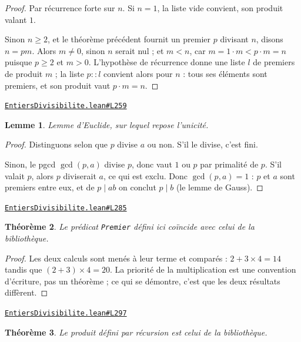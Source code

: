 \documentclass[11pt,a4paper]{article}
\theoremstyle{definition}
\theoremstyle{plain}
\newtheorem{theoreme}{Théorème}
\newtheorem{lemme}[theoreme]{Lemme}
\newcommand{\source}[2]{\par\smallskip\noindent\hfill{\footnotesize\href{#1}{\texttt{#2}}}\par\smallskip}
\begin{document}
\begin{proof}
Par récurrence forte sur $n$. Si $n = 1$, la liste vide convient, son produit valant $1$.

Sinon $n \ge 2$, et le théorème précédent fournit un premier $p$ divisant $n$, disons
$n = pm$. Alors $m \ne 0$, sinon $n$ serait nul ; et $m < n$, car
$m = 1 \cdot m < p \cdot m = n$ puisque $p \ge 2$ et $m > 0$. L'hypothèse de récurrence
donne une liste $l$ de premiers de produit $m$ ; la liste $p :: l$ convient alors pour
$n$ : tous ses éléments sont premiers, et son produit vaut $p \cdot m = n$.
\end{proof}
\source{https://github.com/Commutator-IO/learn-lean/blob/main/cours/01-college/01-nombres-et-calculs/EntiersDivisibilite.lean\#L259}{EntiersDivisibilite.lean\#L259}

\begin{lemme}
Lemme d'Euclide, sur lequel repose l'unicité.
\end{lemme}

\begin{proof}
Distinguons selon que $p$ divise $a$ ou non. S'il le divise, c'est fini.

Sinon, le pgcd $\gcd(p, a)$ divise $p$, donc vaut $1$ ou $p$ par primalité de $p$. S'il
valait $p$, alors $p$ diviserait $a$, ce qui est exclu. Donc $\gcd(p,a) = 1$ : $p$ et $a$
sont premiers entre eux, et de $p \mid ab$ on conclut $p \mid b$
(le lemme de Gauss).
\end{proof}
\source{https://github.com/Commutator-IO/learn-lean/blob/main/cours/01-college/01-nombres-et-calculs/EntiersDivisibilite.lean\#L285}{EntiersDivisibilite.lean\#L285}

\begin{theoreme}
Le prédicat \texttt{Premier} défini ici coïncide avec celui de la bibliothèque.
\end{theoreme}

\begin{proof}
Les deux calculs sont menés à leur terme et comparés : $2 + 3 \times 4 = 14$ tandis que
$(2+3) \times 4 = 20$. La priorité de la multiplication est une convention d'écriture, pas
un théorème ; ce qui se démontre, c'est que les deux résultats diffèrent.
\end{proof}
\source{https://github.com/Commutator-IO/learn-lean/blob/main/cours/01-college/01-nombres-et-calculs/EntiersDivisibilite.lean\#L297}{EntiersDivisibilite.lean\#L297}

\begin{theoreme}
Le produit défini par récursion est celui de la bibliothèque.
\end{theoreme}
\end{document}
